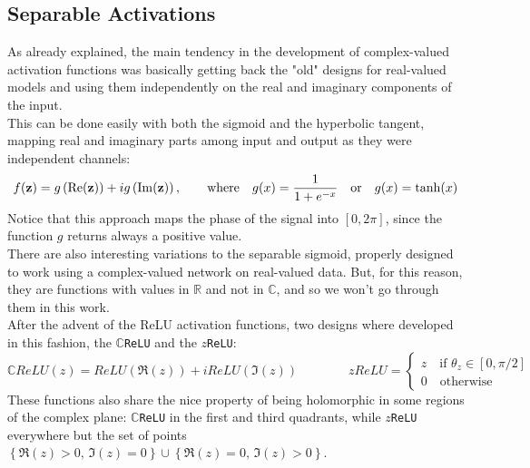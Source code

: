\documentclass[../main.tex]{subfiles}
\begin{document}
\subsection*{Separable Activations}
As already explained, the main tendency in the development of complex-valued activation functions was basically getting back the "old" designs for real-valued models and using them independently on the real and imaginary components of the input.\\
This can be done easily with both the sigmoid and the hyperbolic tangent, mapping real and imaginary parts among input and output as they were independent channels:
\[ f(\vb{z}) = g\left(\Re(\vb{z})\right) + ig\left(\Im(\vb{z})\right), \qquad\text{where}\quad g(x) = \frac{1}{1+e^{-x}} \quad\text{or}\quad g(x)=\tanh(x) \]
Notice that this approach maps the phase of the signal into $[0,2\pi]$, since the function $g$ returns always a positive value.\\
There are also interesting variations to the separable sigmoid, properly designed to work using a complex-valued network on real-valued data. But, for this reason, they are functions with values in $\mathds{R}$ and not in $\mathds{C}$, and so we won't go through them in this work.\\
After the advent of the ReLU activation functions, two designs where developed in this fashion, the \texttt{$\mathds{C}$ReLU} and the \texttt{$z$ReLU}:
\[ \mathds{C}ReLU(z) = ReLU(\Re(z)) + iReLU(\Im(z)) \qquad\qquad zReLU = \begin{cases} z\quad \text{if } \theta_z\in[0,\pi/2] \\ 0\quad\text{otherwise} \end{cases} \]
These functions also share the nice property of being holomorphic in some regions of the complex plane: \texttt{$\mathds{C}$ReLU} in the first and third quadrants, while \texttt{$z$ReLU} everywhere but the set of points $\left\{\Re(z)>0,\, \Im(z)=0\right\} \cup \left\{\Re(z)=0,\, \Im(z)>0\right\}$.
\end{document}
